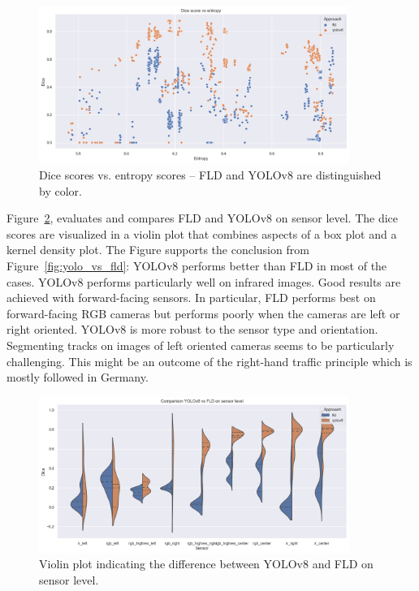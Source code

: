 \documentclass[Master,MDS,english]{BASE/twbook} %
\begin{document}
\begin{figure}[h]
\centering
\includegraphics[width=0.9\textwidth]{images/results/dice_vs_entropy}
\caption{Dice scores vs. entropy scores -- FLD and YOLOv8 are distinguished by color.  }
\label{fig:dice_vs_entropy}
\end{figure}



Figure~\ref{fig:yolo_models}, evaluates and compares FLD and YOLOv8 on sensor level. 
The dice scores are visualized in a violin plot that combines aspects of a box plot and a kernel density plot. 
The Figure supports the conclusion from Figure~\ref{fig:yolo_vs_fld}: YOLOv8 performs better than FLD in most of the cases. YOLOv8 performs particularly well on infrared images. Good results are achieved with forward-facing sensors. In particular, FLD performs best on forward-facing RGB cameras but performs poorly when the cameras are left or right oriented. YOLOv8 is more robust to the sensor type and orientation. Segmenting tracks on images of left oriented cameras seems to be particularly challenging. This might be an outcome of the right-hand traffic principle which is mostly followed in Germany.


\begin{figure}[h]
\centering
\includegraphics[width=0.9\textwidth]{images/results/violin_plot}
\caption{Violin plot indicating the difference between YOLOv8 and FLD on sensor level.  }
\label{fig:yolo_models}
\end{figure}
\end{document}
